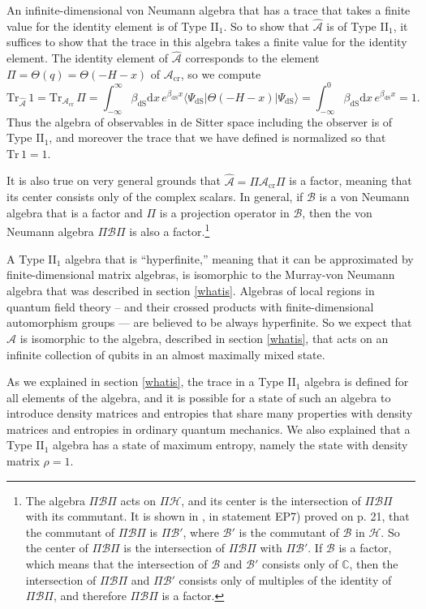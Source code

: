 \documentclass[11pt,a4paper]{article}
\def\be{\begin{equation}}
\def\ee{\end{equation}}
\def\h{\widehat}
\def\A{{\mathcal A}}
\def\d{{\mathrm d}}
\def\C{{\mathbb C}}
\def\h{\widehat}
\def\B{{\mathcal B}}
\def\H{{\mathcal H}}
\def\dS{{\mathrm{dS}}}
\def\la{\langle}
\def\ra{\rangle}
\def\cr{{\mathrm{cr}}}
\def\Tr{{\mathrm{Tr}}}
\begin{document}
An infinite-dimensional von Neumann algebra that has a trace that takes a finite value for the identity element is of Type II$_1$.   So to show that $\h\A$ is of
Type II$_1$, it suffices to show that the trace in this algebra takes a finite value for the identity element.
The identity element of $\h\A$ corresponds to the element $\Pi=\Theta(q)=\Theta(-H-x)$ of $\A_\cr$, so we compute
\be\label{comdel}\Tr_{\h\A}\,1 =\Tr_{\A_\cr}\,\Pi=\int_{-\infty}^\infty \beta_\dS\d x\,e^{\beta_\dS x} \la\Psi_\dS|\Theta(-H-x) |\Psi_\dS\ra =\int_{-\infty}^0 \beta_\dS \d x \,e^{\beta_\dS x}=1. \ee
Thus the algebra of observables in de Sitter space including the observer is of Type II$_1$,  and moreover
the trace that we have defined is normalized so that $\Tr\,1=1$.

 It is also true on very general grounds  that $\h\A=\Pi\A_\cr\Pi$ is a factor, meaning that its center consists only of the complex scalars.
   In general, if $\B$ is a von Neumann algebra that is a factor
and $\Pi$ is a projection operator in $\B$, then the von Neumann algebra $\Pi\B\Pi$ is also a factor.\footnote{The algebra $\Pi\B\Pi$  acts on $\Pi\H$, and its center is the intersection 
of $\Pi\B\Pi$ with its commutant.   It is shown in \cite{VJNotes}, in statement EP7) proved on p. 21, that the commutant of $\Pi\B\Pi$ is $\Pi\B'$, where $\B'$
is the commutant of $\B$ in $\H$.   So the center of $\Pi\B\Pi$ is the intersection of $\Pi\B\Pi$ with $\Pi\B'$.    If $\B$ is a factor, which means that the intersection of
$\B$ and $\B'$ consists only of $\C$, then the intersection of $\Pi\B\Pi$ and $\Pi\B'$ consists only of multiples of the identity of $\Pi\B\Pi$, 
 and therefore $\Pi\B\Pi$ is a factor.}

A Type II$_1$ algebra that is ``hyperfinite,'' meaning that it can be approximated by finite-dimensional matrix algebras, is isomorphic to the Murray-von Neumann
algebra that was described in section \ref{whatis}.    Algebras of local regions in quantum field theory -- and their crossed products with finite-dimensional automorphism
groups --- are believed to be always hyperfinite.  So we expect that $\h\A$ is isomorphic to the algebra, described in section \ref{whatis}, that acts on
an infinite collection of qubits in an almost maximally mixed state.



As we explained in section \ref{whatis}, the trace in a Type II$_1$ algebra is defined for all elements of the algebra, and it is possible for a state of such an algebra
to introduce density matrices and entropies that share many properties with density matrices and entropies in ordinary quantum mechanics.
We also explained that a Type II$_1$ algebra has a state of maximum entropy, namely the state with density matrix $\rho=1$.
\end{document}
